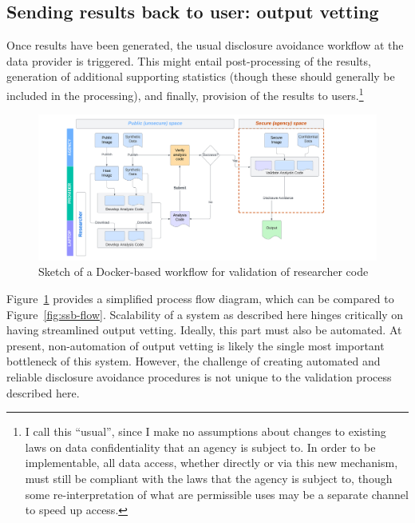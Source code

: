 \documentclass[inline]{hdsr}
\begin{document}





\subsection{Sending results back to user: output vetting}

Once results have been generated, the usual disclosure avoidance workflow at the data provider is triggered. This might entail post-processing of the results, generation of additional supporting statistics (though these should generally be included in the processing), and finally, provision of the results to users.\footnote{I call this ``usual'', since I make no assumptions about changes to existing laws on data confidentiality that an agency is subject to. In order to be implementable, all data access, whether directly or via this new mechanism, must still be compliant with the laws that the agency is subject to, though some re-interpretation of what are permissible uses may be a separate channel to speed up access.}

\begin{figure}
    \centering
    \includegraphics[width=1\linewidth]{NBER Docker Flow.png}
    \caption{Sketch of a Docker-based workflow for validation of researcher code}
    \label{fig:docker-workflow}
\end{figure}

 Figure~\ref{fig:docker-workflow} provides a simplified process flow diagram, which can be compared to Figure~\ref{fig:ssb-flow}. Scalability of a system as described here hinges critically on having streamlined output vetting. Ideally, this  part must also be automated. At present, non-automation of output vetting is likely the single most important bottleneck of this system. However, the challenge of creating automated and reliable disclosure avoidance procedures is  not unique to the validation process described here.
\end{document}
